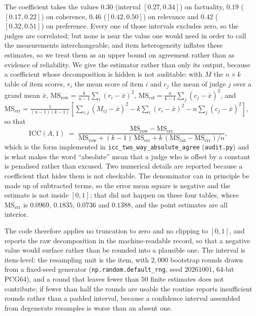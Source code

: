 \documentclass{article}
\newcommand{\ids}[1]{\texttt{\small #1}} %
\begin{document}
The coefficient takes the values $0.30$ (interval $[0.27,0.34]$) on factuality, $0.19$ ($[0.17,0.22]$) on coherence, $0.46$ ($[0.42,0.50]$) on relevance and $0.42$ ($[0.32,0.51]$) on preference. Every one of those intervals excludes zero, so the judges are correlated; but none is near the value one would need in order to call the measurements interchangeable, and item heterogeneity inflates these estimates, so we treat them as an upper bound on agreement rather than as evidence of reliability. We give the estimator rather than only its output, because a coefficient whose decomposition is hidden is not auditable: with $M$ the $n \times k$ table of item scores, $r_i$ the mean score of item $i$ and $c_j$ the mean of judge $j$ over a grand mean $\bar{x}$,
$\mathrm{MS}_{\mathrm{row}} = \frac{k}{n-1}\sum_i (r_i - \bar{x})^2$,
$\mathrm{MS}_{\mathrm{col}} = \frac{n}{k-1}\sum_j (c_j - \bar{x})^2$, and
$\mathrm{MS}_{\mathrm{err}} = \frac{1}{(n-1)(k-1)}\left[\sum_{i,j}(M_{ij}-\bar{x})^2 - k\sum_i(r_i-\bar{x})^2 - n\sum_j(c_j-\bar{x})^2\right]$, so that
$$\mathrm{ICC}(A,1) \;=\; \frac{\mathrm{MS}_{\mathrm{row}} - \mathrm{MS}_{\mathrm{err}}}{\mathrm{MS}_{\mathrm{row}} + (k-1)\,\mathrm{MS}_{\mathrm{err}} + k\,(\mathrm{MS}_{\mathrm{col}} - \mathrm{MS}_{\mathrm{err}})/n},$$
which is the form implemented in \ids{icc\_two\_way\_absolute\_agree} (\ids{audit.py}) and is what makes the word ``absolute'' mean that a judge who is offset by a constant is penalised rather than excused. Two numerical details are reported because a coefficient that hides them is not checkable. The denominator can in principle be made up of subtracted terms, so the error mean square is negative and the estimate is not inside $[0,1]$; that did not happen on these four tables, where $\mathrm{MS}_{\mathrm{err}}$ is $0.0969$, $0.1835$, $0.0736$ and $0.1388$, and the point estimates are all interior. 

The code therefore applies no truncation to zero and no clipping to $[0,1]$, and reports the raw decomposition in the machine-readable record, so that a negative value would surface rather than be rounded into a plausible one. The interval is item-level: the resampling unit is the item, with $2{,}000$ bootstrap rounds drawn from a fixed-seed generator (\ids{np.random.default\_rng}, seed $20261001$, 64-bit PCG64), and a round that leaves fewer than $50$ finite estimates does not contribute; if fewer than half the rounds are usable the routine reports insufficient rounds rather than a padded interval, because a confidence interval assembled from degenerate resamples is worse than an absent one. 
\end{document}
